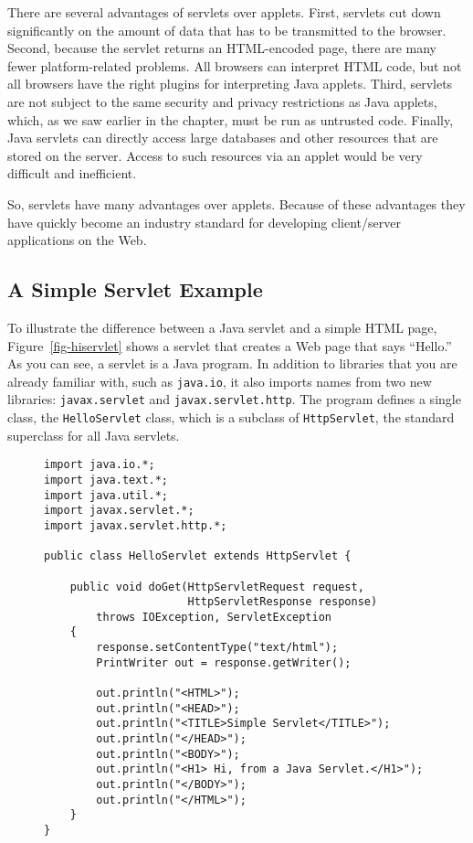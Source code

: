 {{{{There are several advantages of servlets over applets. First, servlets
cut down significantly on the amount of data that has to be
transmitted to the browser. Second, because the
servlet returns an HTML-encoded page, there are many fewer
platform-related problems.  All browsers can interpret HTML code, but
not all browsers have the right plugins for interpreting Java applets.
Third, servlets are not subject to the same security and privacy
restrictions as Java applets, which, as we saw earlier in the chapter,
must be run as untrusted code.  Finally, Java servlets can directly
access large databases and other resources that are stored on the
server.  Access to such resources via an applet would be very
difficult and inefficient.

So, servlets have many advantages over applets. Because of these
advantages they have quickly become an industry standard for
developing client/server applications on the Web.

\subsection{A Simple Servlet Example}

To illustrate the difference between a Java servlet and a simple HTML
page, Figure~\ref{fig-hiservlet} shows a servlet that creates a
Web page that says ``Hello.''  As you can see, a servlet is a
Java program. In addition to libraries that you are already familiar
with, such as {\tt java.io}, it also imports names from two new
libraries: {\tt javax.servlet} and {\tt javax.servlet.http}.  The
program defines a single class, the {\tt HelloServlet} class, which is
a subclass of {\tt HttpServlet}, the standard superclass for all Java
servlets.  

\begin{figure}[tb]
\jjjprogstart
\begin{jjjlisting}
\begin{lstlisting}
import java.io.*;
import java.text.*;
import java.util.*;
import javax.servlet.*;
import javax.servlet.http.*;

public class HelloServlet extends HttpServlet {

    public void doGet(HttpServletRequest request,
                      HttpServletResponse response)
        throws IOException, ServletException
    {
        response.setContentType("text/html");
        PrintWriter out = response.getWriter();

        out.println("<HTML>");
        out.println("<HEAD>");
        out.println("<TITLE>Simple Servlet</TITLE>");
        out.println("</HEAD>");
        out.println("<BODY>");
        out.println("<H1> Hi, from a Java Servlet.</H1>");
        out.println("</BODY>");
        out.println("</HTML>");
    }
}


\end{lstlisting}
\end{jjjlisting}
\end{figure}}}}}
